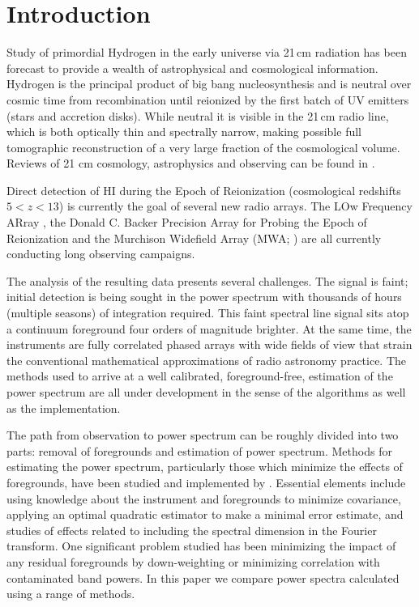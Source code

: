 \documentclass[preprint2]{aastex}
\begin{document}
\section{Introduction} 
  Study of primordial Hydrogen  in the early universe via 21\,cm radiation has been forecast to provide a wealth of astrophysical and cosmological information.   Hydrogen is the principal product of big bang nucleosynthesis and is neutral over cosmic time from recombination until reionized by the first batch of UV emitters (stars and accretion disks). While neutral it is visible in the 21\,cm radio line, which is both optically thin and spectrally narrow, making possible full tomographic reconstruction of a very large fraction of the cosmological volume.  Reviews of 21 cm cosmology, astrophysics and observing can be found in \cite{Morales:2010p8093,Furlanetto:2006p2267,Pritchard:2012p9555,zaroubi2013epoch}.
  
Direct detection of HI during the Epoch of Reionization (cosmological redshifts $5<z<13$) is currently the goal of several new radio arrays. The LOw Frequency ARray \citep[LOFAR;][]{Yatawatta:2013p9699}, the Donald C. Backer Precision Array for Probing the Epoch of Reionization \citep[PAPER][]{Parsons:2014p10499} and the Murchison Widefield Array (MWA; \cite{Tingay:2013p9022,Bowman:2013p9950}) are all currently conducting long observing campaigns.



The analysis of the resulting data presents several challenges. The signal is faint; initial detection is being sought in the power spectrum with thousands of hours (multiple seasons) of integration required. This faint spectral line signal sits atop a continuum foreground four orders of magnitude brighter. At the same time, the instruments are fully correlated phased arrays with wide fields of view that strain the conventional mathematical approximations of radio astronomy practice. The methods used to arrive at a well calibrated, foreground-free, estimation of the power spectrum are all under development in the sense of the algorithms as well as the implementation.  


The path from observation to power spectrum can be roughly divided into two parts: removal of foregrounds and estimation of power spectrum. 
Methods for estimating the power spectrum, particularly those which minimize the effects of foregrounds, have been studied and implemented by \citet{Morales:2006p1870,Morales:2012p8790,Dillon:2013p10497,Dillon:2014p9788,Liu:2011p8763,Liu:2014p10462,Liu:2014p10463,Trott:2012p10466}. Essential elements include using knowledge about the instrument and foregrounds to minimize covariance, applying an optimal quadratic estimator to make a minimal error estimate, and studies of effects related to including the spectral dimension in the Fourier transform.  One significant problem studied has been minimizing the impact of any residual foregrounds by down-weighting or minimizing correlation with contaminated band powers. In this paper we compare power spectra calculated using a range of methods. 
\end{document}
